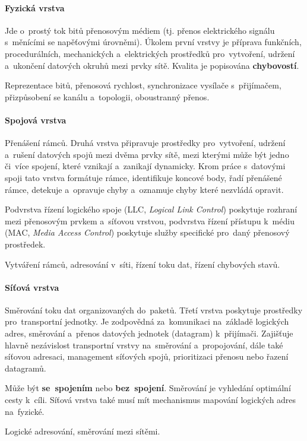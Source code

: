 \paragraph{Fyzická vrstva} Jde o~prostý tok bitů přenosovým médiem (tj. přenos elektrického signálu s~měnícími se napěťovými úrovněmi). Úkolem první vrstvy je příprava funkčních, procedurálních, mechanických a~elektrických prostředků pro~vytvoření, udržení a~ukončení datových okruhů mezi prvky sítě. Kvalita je popisována \textbf{chybovostí}.

Reprezentace bitů, přenosová rychlost, synchronizace vysílače s~přijímačem, přizpůsobení se kanálu a~topologii, oboustranný přenos.

\paragraph{Spojová vrstva} Přenášení rámců. Druhá vrstva připravuje prostředky pro~vytvoření, udržení a~rušení datových spojů mezi dvěma prvky sítě, mezi kterými může být jedno či~více spojení, které vznikají a~zanikají dynamicky. Krom práce s~datovými spoji tato vrstva formátuje rámce, identifikuje koncové body, řadí přenášené rámce, detekuje a~opravuje chyby a~oznamuje chyby které nezvládá opravit.

Podvrstva řízení logického spoje (LLC, \emph{Logical Link Control}) poskytuje rozhraní mezi přenosovým prvkem a~síťovou vrstvou, podvrstva řízení přístupu k~médiu (MAC, \emph{Media Access Control}) poskytuje služby specifické pro~daný přenosový prostředek.

Vytváření rámců, adresování v~síti, řízení toku dat, řízení chybových stavů.

\paragraph{Síťová vrstva} Směrování toku dat organizovaných do~paketů. Třetí vrstva poskytuje prostředky pro~transportní jednotky. Je zodpovědná za~komunikaci na~základě logických adres, směrování a~přenos datových jednotek (datagram) k~přijímači. Zajišťuje hlavně nezávislost transportní vrstvy na~směrování a~propojování, dále také síťovou adresaci, management síťových spojů, prioritizaci přenosu nebo řazení datagramů.

Může být \textbf{se~spojením} nebo \textbf{bez~spojení}. Směrování je vyhledání optimální cesty k~cíli. Síťová vrstva také musí mít mechanismus mapování logických adres na~fyzické.

Logické adresování, směrování mezi sítěmi.

